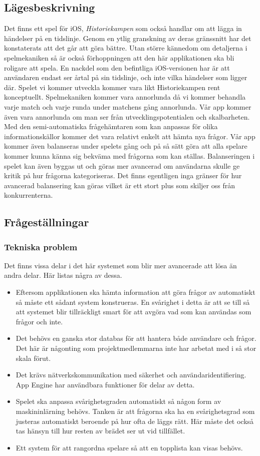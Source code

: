 \documentclass[12pt,a4paper]{article}
\begin{document}
\subsection{Lägesbeskrivning}
Det finns ett spel för iOS, \textit{Historiekampen}\cite{historiekampen} som också handlar om att lägga in händelser på en tidslinje. Genom en ytlig granskning av deras gränssnitt har det konstaterats att det går att göra bättre. Utan större kännedom om detaljerna i spelmekaniken så är också förhoppningen att den här applikationen ska bli roligare att spela. En nackdel som den befintliga iOS-versionen har är att användaren endast ser årtal på sin tidslinje, och inte vilka händelser som ligger där.
Spelet vi kommer utveckla kommer vara likt Historiekampen rent konceptuellt. Spelmekaniken kommer vara annorlunda då vi kommer behandla varje match och varje runda under matchens gång annorlunda. Vår app kommer även vara annorlunda om man ser från utvecklingspotentialen och skalbarheten. Med den semi-automatiska frågehämtaren som kan anpassas för olika informationskällor kommer det vara relativt enkelt att hämta nya frågor. Vår app kommer även balanseras under spelets gång och på så sätt göra att alla spelare kommer kunna känna sig bekväma med frågorna som kan ställas. Balanseringen i spelet kan även byggas ut och göras mer avancerad om användarna skulle ge kritik på hur frågorna kategoriseras. Det finns egentligen inga gränser för hur avancerad balansering kan göras vilket är ett stort plus som skiljer oss från konkurrenterna.  


\subsection{Frågeställningar}

\subsubsection{Tekniska problem}
Det finns vissa delar i det här systemet som blir mer avancerade att lösa än andra delar. Här listas några av dessa.
\begin{itemize}
\item Eftersom applikationen ska hämta information att göra frågor av automatiskt så måste ett sådant system konstrueras. En svårighet i detta är att se till så att systemet blir tillräckligt smart för att avgöra vad som kan användas som frågor och inte.
\item Det behövs en ganska stor databas för att hantera både användare och frågor. Det här är någonting som projektmedlemmarna inte har arbetat med i så stor skala förut.
\item Det krävs nätverkskommunikation med säkerhet och användaridentifiering. App Engine har användbara funktioner för delar av detta.
\item Spelet ska anpassa svårighetsgraden automatiskt så någon form av maskininlärning behövs. Tanken är att frågorna ska ha en svårighetsgrad som justeras automatiskt beroende på hur ofta de läggs rätt. Här måste det också tas hänsyn till hur resten av brädet ser ut vid tillfället.
\item Ett system för att rangordna spelare så att en topplista kan visas behövs.
\end{itemize}
\end{document}

